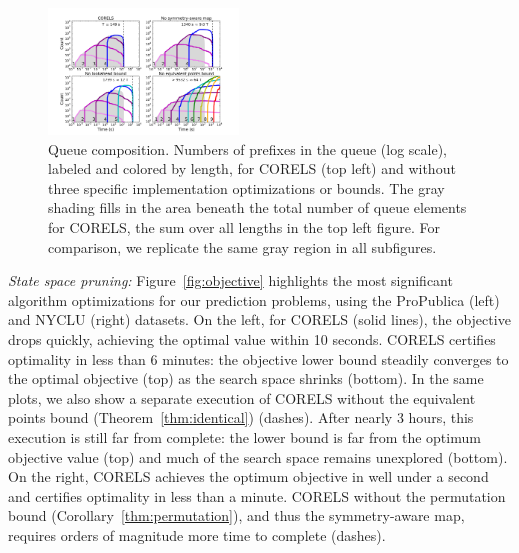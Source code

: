 \begin{figure}[t!]
\begin{center}
\includegraphics[trim={30mm 15mm 35mm 30mm},
width=0.45\textwidth]{figs/kdd_compas_ablation_small-queue.pdf}
\end{center}
\caption{Queue composition.
%
Numbers of prefixes in the queue (log scale), labeled and colored by length,
for CORELS (top left) and without three specific implementation optimizations or bounds.
%
The gray shading fills in the area beneath the total number of
queue elements for CORELS,
\ie the sum over all lengths in the top left figure.
%
For comparison, we replicate the same gray region in all subfigures.
}
\label{fig:queue}
\end{figure}


\textit{State space pruning:}
Figure~\ref{fig:objective} highlights the most significant
algorithm optimizations for our prediction problems,
using the ProPublica (left) and NYCLU (right) datasets.
%
On the left, for CORELS (solid lines),
the objective drops quickly, achieving the optimal value within 10 seconds.
%
CORELS certifies optimality in less than 6 minutes:
the objective lower bound steadily converges to the optimal objective (top)
as the search space shrinks (bottom).
%
In the same plots, we also show
a separate execution of CORELS without the equivalent points bound
(Theorem~\ref{thm:identical}) (dashes).
%
After nearly 3 hours, this execution is still far from complete:
the lower bound is far from the optimum objective value (top)
and much of the search space remains unexplored (bottom).
%
On the right,
CORELS achieves the optimum objective in well under a second
and certifies optimality in less than a minute.
%
CORELS without the permutation bound (Corollary~\ref{thm:permutation}),
and thus the symmetry-aware map,
requires orders of magnitude more time to complete (dashes).

